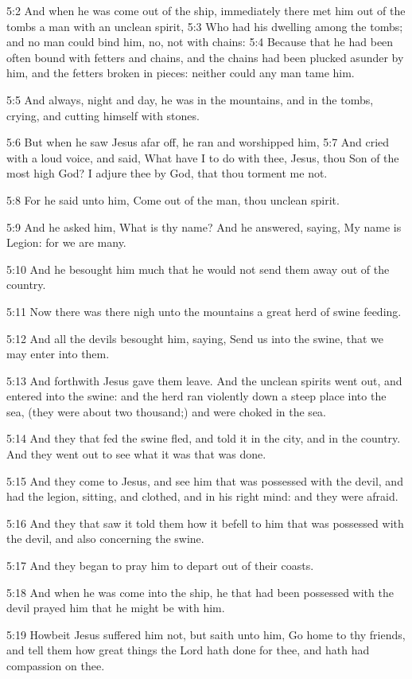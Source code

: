 5:2 And when he was come out of the ship, immediately there met him
out of the tombs a man with an unclean spirit, 5:3 Who had his
dwelling among the tombs; and no man could bind him, no, not with
chains: 5:4 Because that he had been often bound with fetters and
chains, and the chains had been plucked asunder by him, and the
fetters broken in pieces: neither could any man tame him.

5:5 And always, night and day, he was in the mountains, and in the
tombs, crying, and cutting himself with stones.

5:6 But when he saw Jesus afar off, he ran and worshipped him, 5:7 And
cried with a loud voice, and said, What have I to do with thee, Jesus,
thou Son of the most high God? I adjure thee by God, that thou torment
me not.

5:8 For he said unto him, Come out of the man, thou unclean spirit.

5:9 And he asked him, What is thy name? And he answered, saying, My
name is Legion: for we are many.

5:10 And he besought him much that he would not send them away out of
the country.

5:11 Now there was there nigh unto the mountains a great herd of swine
feeding.

5:12 And all the devils besought him, saying, Send us into the swine,
that we may enter into them.

5:13 And forthwith Jesus gave them leave. And the unclean spirits went
out, and entered into the swine: and the herd ran violently down a
steep place into the sea, (they were about two thousand;) and were
choked in the sea.

5:14 And they that fed the swine fled, and told it in the city, and in
the country. And they went out to see what it was that was done.

5:15 And they come to Jesus, and see him that was possessed with the
devil, and had the legion, sitting, and clothed, and in his right
mind: and they were afraid.

5:16 And they that saw it told them how it befell to him that was
possessed with the devil, and also concerning the swine.

5:17 And they began to pray him to depart out of their coasts.

5:18 And when he was come into the ship, he that had been possessed
with the devil prayed him that he might be with him.

5:19 Howbeit Jesus suffered him not, but saith unto him, Go home to
thy friends, and tell them how great things the Lord hath done for
thee, and hath had compassion on thee.

